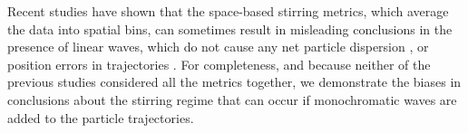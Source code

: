 \documentclass[]{ametsoc}
\begin{document}
%
\appendix[A]
Recent studies have shown that the space-based stirring metrics, which average the data into spatial bins, can sometimes result in misleading conclusions in the presence of linear waves, which do not cause any net particle dispersion \citep{vera2016}, or position errors in trajectories \citep{haza2014does}. For completeness, and because neither of the previous studies considered all the metrics together, we demonstrate the biases in conclusions about the stirring regime that can occur if monochromatic waves are added to the particle trajectories. 
\end{document}
